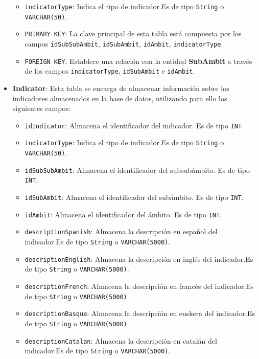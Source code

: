 \begin{itemize}
\begin{itemize}
        \item \texttt{indicatorType}: Indica el tipo de indicador.Es de tipo \texttt{String} o \texttt{VARCHAR(50)}.
        \item \texttt{PRIMARY KEY}: La clave principal de esta tabla está compuesta por los campos \texttt{idSubSubAmbit}, \texttt{idSubAmbit}, \texttt{idAmbit}, \texttt{indicatorType}.
        \item \texttt{FOREIGN KEY}: Establece una relación con la entidad \textbf{SubAmbit} a través de los campos \texttt{indicatorType}, \texttt{idSubAmbit} e \texttt{idAmbit}.
        \end{itemize}


    \item \textbf{Indicator}: Esta tabla se encarga de almacenar información sobre los indicadores almacenados en la base de datos, utilizando para ello los siguientes campos:
        \begin{itemize}
        \item \texttt{idIndicator}: Almacena el identificador del indicador. Es de tipo \texttt{INT}.
        \item \texttt{indicatorType}: Indica el tipo de indicador.Es de tipo \texttt{String} o \texttt{VARCHAR(50)}.
        \item \texttt{idSubSubAmbit}: Almacena el identificador del subsubámbito. Es de tipo \texttt{INT}.
        \item \texttt{idSubAmbit}: Almacena el identificador del subámbito. Es de tipo \texttt{INT}.
        \item \texttt{idAmbit}: Almacena el identificador del ámbito. Es de tipo \texttt{INT}.
        \item \texttt{descriptionSpanish}: Almacena la descripción en español del indicador.Es de tipo \texttt{String} o \texttt{VARCHAR(5000)}.
        \item \texttt{descriptionEnglish}: Almacena la descripción en inglés del indicador.Es de tipo \texttt{String} o \texttt{VARCHAR(5000)}.
        \item \texttt{descriptionFrench}: Almacena la descripción en francés del indicador.Es de tipo \texttt{String} o \texttt{VARCHAR(5000)}.
        \item \texttt{descriptionBasque}: Almacena la descripción en euskera del indicador.Es de tipo \texttt{String} o \texttt{VARCHAR(5000)}.
        \item \texttt{descriptionCatalan}: Almacena la descripción en catalán del indicador.Es de tipo \texttt{String} o \texttt{VARCHAR(5000)}.

\end{itemize}
\end{itemize}
